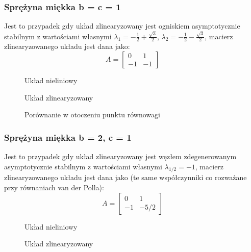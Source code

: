 \documentclass[a4paper, 10pt]{article}
\begin{document}
			\subsubsection{Sprężyna miękka b = c = 1}
				Jest to przypadek gdy układ zlinearyzowany jest ogniskiem asymptotycznie stabilnym z wartościami własnymi $\lambda_1 = -\frac{1}{2} + \frac{\sqrt{3}}{2}$, $\lambda_2 = -\frac{1}{2} - \frac{\sqrt{3}}{2}$, macierz zlinearyzowanego układu jest dana jako:
				$$
				A = \begin{bmatrix}
				0 & 1 \\
				-1  & -1
				\end{bmatrix}
				$$
				\begin{figure}[H]
					\centering
					\def \svgwidth{0.8\columnwidth}
					
					\caption{Układ nieliniowy}
				\end{figure}\noindent
				
				
				\begin{figure}[H]
					\centering
					\def \svgwidth{0.8\columnwidth}
					
					\caption{Układ zlinearyzowany}
				\end{figure}\noindent
				
				
				\begin{figure}[H]
					\centering
					\def \svgwidth{0.8\columnwidth}
					
					\caption{Porównanie w otoczeniu punktu równowagi}
				\end{figure}\noindent
				
			\subsubsection{Sprężyna miękka b = 2, c = 1}
				Jest to przypadek gdy układ zlinearyzowany jest węzłem zdegenerowanym asymptotycznie stabilnym z wartościami własnymi $\lambda_{1/2} =-1$, macierz zlinearyzowanego układu jest dana jako (te same współczynniki co rozważane przy równaniach van der Polla):
				$$
				A = \begin{bmatrix}
				0 & 1 \\
				-1  & -5/2
				\end{bmatrix}
				$$
				\begin{figure}[H]
					\centering
					\def \svgwidth{0.8\columnwidth}
					
					\caption{Układ nieliniowy}
				\end{figure}\noindent
				
				
				\begin{figure}[H]
					\centering
					\def \svgwidth{0.8\columnwidth}
					
					\caption{Układ zlinearyzowany}
				\end{figure}\noindent
				
\end{document}
